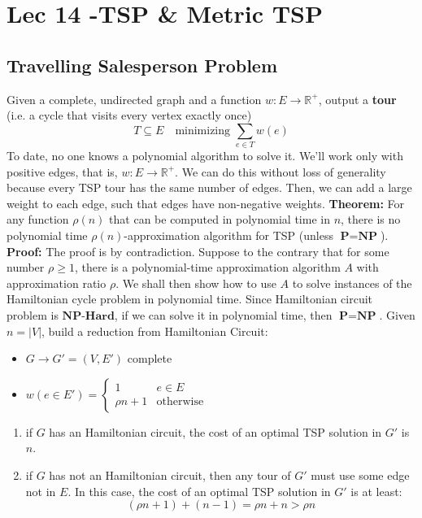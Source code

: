 \chapter{Lec 14 -TSP \& Metric TSP}
\section{Travelling Salesperson Problem}
Given a complete, undirected graph and a function $w: E \rightarrow \mathbb{R}^+$, output a \textbf{tour} (i.e. a cycle that visits every vertex exactly once)
\[T \subseteq E \quad \text{minimizing }\sum_{e \in T}w(e)\]
To date, no one knows a polynomial algorithm to solve it.\newline\newline
We'll work only with positive edges, that is, $w: E \rightarrow \mathbb{R}^+$. We can do this without loss of generality because every TSP tour has the same number of edges. Then, we can add a large weight to each edge, such that edges have non-negative weights.\newline\newline
\textbf{Theorem:} For any function $\rho(n)$ that can be computed in polynomial time in $n$, there is no polynomial time $\rho(n)$-approximation algorithm for TSP (unless $\textbf{P} = \textbf{NP}$).\newline\newline
\textbf{Proof:} The proof is by contradiction. Suppose to the contrary that for some number $\rho \geq 1$, there is a polynomial-time approximation algorithm $A$ with approximation ratio $\rho$. We shall then show how to use $A$ to solve instances of the Hamiltonian cycle problem in polynomial time. Since Hamiltonian circuit problem is $\textbf{NP-Hard}$, if we can solve it in polynomial time, then $\textbf{P} = \textbf{NP}$.\newline\newline
Given $n = |V|$, build a reduction from Hamiltonian Circuit:
\begin{itemize}
    \item $G \rightarrow G' = (V, E')$ complete
    \item $w(e \in E') = \begin{cases}
                            1 & e \in E\\
                            \rho n + 1 & \text{otherwise}
                         \end{cases}$
\end{itemize}
\begin{enumerate}
    \item if $G$ has an Hamiltonian circuit, the cost of an optimal TSP solution in $G'$ is $n$.

    \item if $G$ has not an Hamiltonian circuit, then any tour of $G'$ must use some edge not in $E$. In this case, the cost of an optimal TSP solution in $G'$ is at least:
    \[(\rho n + 1) + (n - 1) = \rho n + n > \rho n\]
\end{enumerate}
